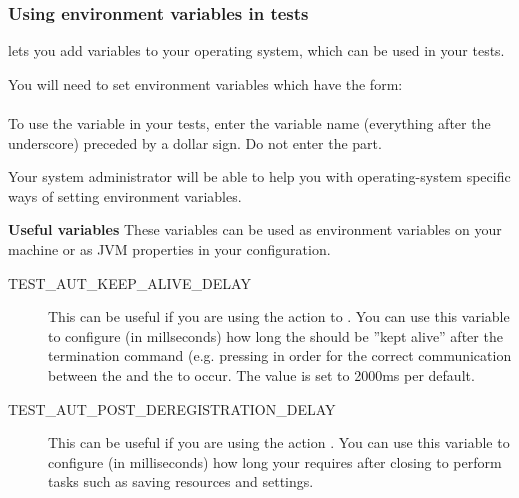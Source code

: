 \subsubsection{Using environment variables in tests}
\label{TasksSystemVariables}


\app{} lets you add variables to your operating system, which can be used in your tests. 

You will need to set environment variables which have the form:\\

\\


To use the variable in your tests, enter the variable name (everything after the underscore) preceded by a dollar sign. Do not enter the  part.


Your system administrator will be able to help you with operating-system specific ways of setting environment variables. 

\textbf{Useful variables}
These variables can be used as environment variables on your machine or as JVM properties in your \gdaut{} configuration. 

\begin{description}
\item [TEST\_AUT\_KEEP\_ALIVE\_DELAY]{This can be useful if you are using the action to . You can use this variable to configure (in millseconds) how long the \gdaut{} should be ''kept alive'' after the termination command (e.g. pressing  in order for the correct communication between the \ite{} and the \gdaut{} to occur. The value is set to 2000ms per default. }
\item [TEST\_AUT\_POST\_DEREGISTRATION\_DELAY]{This can be useful if you are using the action . You can use this variable to configure (in milliseconds) how long your \gdaut{} requires after closing to perform tasks such as saving resources and settings. }
\end{description}



